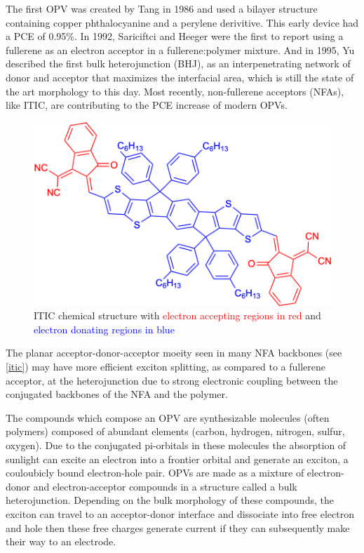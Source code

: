 The first OPV was created by Tang in 1986 and used a bilayer structure containing copper phthalocyanine and a perylene derivitive\cite{Tang1986b}. 
This early device had a PCE of 0.95\%.
In 1992, Sariciftci and Heeger were the first to report using a fullerene as an electron acceptor in a fullerene:polymer mixture\cite{Sariciftci1992}.
And in 1995, Yu described the first bulk heterojunction (BHJ), as an interpenetrating network of donor and acceptor that maximizes the interfacial area, which is still the state of the art morphology to this day\cite{Yu1995}.
Most recently, non-fullerene acceptors (NFAs), like ITIC, are contributing to the PCE increase of modern OPVs\cite{S.Gurney2019b}.

\begin{figure}
    \centering
    \includegraphics[width=\linewidth]{images/ITIC.pdf}
    \caption{ITIC chemical structure with \textcolor{red}{electron accepting regions in red} and \textcolor{blue}{electron donating regions in blue}}\label{itic}
\end{figure}

\noindent The planar acceptor-donor-acceptor moeity seen in many NFA backbones (see \autoref{itic}) may have more efficient exciton splitting, as compared to a fullerene acceptor, at the heterojunction due to strong electronic coupling between the conjugated backbones of the NFA and the polymer\cite{Yi2018a}.

The compounds which compose an OPV are synthesizable molecules (often polymers) composed of abundant elements (carbon, hydrogen, nitrogen, sulfur, oxygen).
Due to the conjugated pi-orbitals in these molecules the absorption of sunlight can excite an electron into a frontier orbital and generate an exciton, a couloubicly bound electron-hole pair.
OPVs are made as a mixture of electron-donor and electron-acceptor compounds in a structure called a bulk heterojunction.
Depending on the bulk morphology of these compounds, the exciton can travel to an acceptor-donor interface and dissociate into free electron and hole then these free charges generate current if they can subsequently make their way to an electrode.

